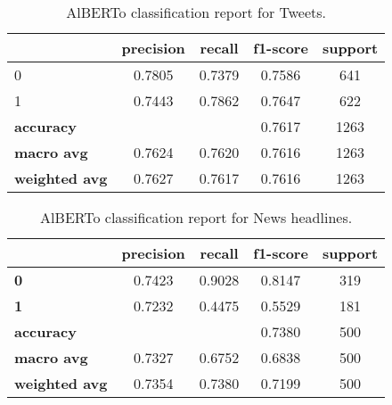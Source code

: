 \begin{table}[h]
    \centering
    \begin{tabular}{lcccc}
        \hline
        & \textbf{precision} & \textbf{recall} & \textbf{f1-score} & \textbf{support} \\
        \hline
        0 & 0.7805 & 0.7379 & 0.7586 & 641 \\
        1 & 0.7443 & 0.7862 & 0.7647 & 622 \\
        \hline
        \textbf{accuracy} & & & 0.7617 & 1263 \\
        \textbf{macro avg} & 0.7624 & 0.7620 & 0.7616 & 1263 \\
        \textbf{weighted avg} & 0.7627 & 0.7617 & 0.7616 & 1263 \\
        \hline
    \end{tabular}
    \caption{AlBERTo classification report for Tweets.}
    \label{tab:classification_report_alberto_tweets}
\end{table}

\begin{table}[h]
    \centering
    \begin{tabular}{lcccc}
        \toprule
                     & \textbf{precision} & \textbf{recall} & \textbf{f1-score} & \textbf{support} \\
        \midrule
        \textbf{0}          & 0.7423  & 0.9028 & 0.8147  & 319 \\
        \textbf{1}          & 0.7232  & 0.4475 & 0.5529  & 181 \\
        \midrule
        \textbf{accuracy}   &         &        & 0.7380  & 500 \\
        \textbf{macro avg}  & 0.7327  & 0.6752 & 0.6838  & 500 \\
        \textbf{weighted avg} & 0.7354  & 0.7380 & 0.7199  & 500 \\
        \bottomrule
    \end{tabular}
    \caption{AlBERTo classification report for News headlines.}
    \label{tab:classification_report_alberto_news}
\end{table}

